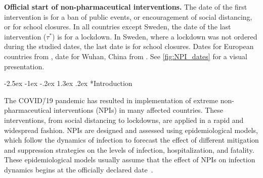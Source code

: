\documentclass[12pt]{extarticle}
\makeatletter
\renewcommand\section{\@startsection {section}{1}{\z@}%
     {-2.5ex \@plus -1ex \@minus -.2ex}%
     {1.3ex \@plus.2ex}%
    {\Large\bfseries}}
\newcommand{\covid}{COVID\=/19 }
\makeatother
\begin{document}
\pagebreak



\begin{table}[b!]
\centering
{}
\caption{
\textbf{Official start of non-pharmaceutical interventions.}
The date of the first intervention is for a ban of public events, or encouragement of social distancing, or for school closures.
In all countries except Sweden, the date of the last intervention ($\tau^*$) is for a lockdown. In Sweden, where a lockdown was not ordered during the studied dates, the last date is for school closures. Dates for European countries from \citet{Flaxman2020}, date for Wuhan, China from \citet{Pei2020}. See \autoref{fig:NPI_dates} for a visual presentation.
}
\label{table:NPI_dates}
\end{table}



\section*{Introduction}

The \covid pandemic has resulted in implementation of extreme non-pharmaceutical interventions (NPIs) in many affected countries. These interventions, from social distancing to lockdowns, are applied in a rapid and widespread fashion.
NPIs are designed and assessed using epidemiological models, which follow the dynamics of infection to forecast the effect of different mitigation and suppression strategies on the levels of infection, hospitalization, and fatality.
These epidemiological models usually assume that the effect of NPIs on infection dynamics begins at the officially declared date~\citep{Flaxman2020,Gatto2020,Li2020}.
\end{document}
